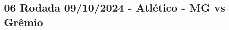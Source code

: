 \newpage
\subsection{06 Rodada 09/10/2024 - Atlético - MG vs Grêmio}

\begin{figure}[H]
    \centering
    
\end{figure}